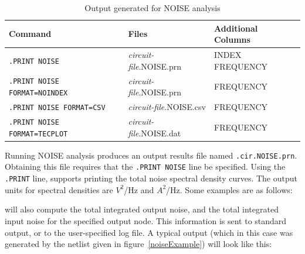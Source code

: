 \begin{table}[htbp]
  \caption{Output generated for NOISE analysis \label{NOISE_Output_table}}
  \begin{tabularx}{\linewidth}{|p{2.75in}|Y|Y|}
     \color{white}\textbf{Command} & \color{white}\textbf{Files} & \color{white}\textbf{Additional Columns} \\ \hline
\texttt{.PRINT NOISE} & \emph{circuit-file}.NOISE.prn & INDEX FREQUENCY \\ \hline
\texttt{.PRINT NOISE FORMAT=NOINDEX} & \emph{circuit-file}.NOISE.prn & FREQUENCY \\ \hline
\texttt{.PRINT NOISE FORMAT=CSV} & \emph{circuit-file}.NOISE.csv & FREQUENCY \\ \hline
\texttt{.PRINT NOISE FORMAT=TECPLOT} & \emph{circuit-file}.NOISE.dat & FREQUENCY \\ \hline
  \end{tabularx}
\end{table}

\label{NOISE_print}

Running \Xyce{} NOISE analysis produces an output results file named
\verb|.cir.NOISE.prn|. Obtaining this file requires that the \verb|.PRINT NOISE| line
be specified. Using the \texttt{.PRINT} line, \Xyce{} supports printing the total 
noise spectral density curves.  The output units for spectral densities 
are $V^2$/Hz and $A^2$/Hz.  Some examples are as follows: 

\Xyce{} will also compute the total integrated output noise, and the total
integrated input noise for the specified output node.  This information is sent
to standard output, or to the user-specified log file.  A typical output (which 
in this case was generated by the netlist given in figure~\ref{noiseExample}) will
look like this:


